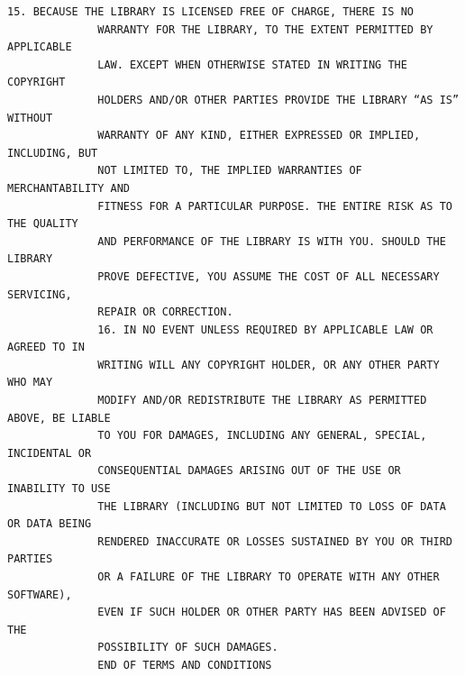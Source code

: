 \begin{lstlisting}[basicstyle=\ttfamily\scriptsize,breaklines=true]
              15. BECAUSE THE LIBRARY IS LICENSED FREE OF CHARGE, THERE IS NO
              WARRANTY FOR THE LIBRARY, TO THE EXTENT PERMITTED BY APPLICABLE
              LAW. EXCEPT WHEN OTHERWISE STATED IN WRITING THE COPYRIGHT
              HOLDERS AND/OR OTHER PARTIES PROVIDE THE LIBRARY “AS IS” WITHOUT
              WARRANTY OF ANY KIND, EITHER EXPRESSED OR IMPLIED, INCLUDING, BUT
              NOT LIMITED TO, THE IMPLIED WARRANTIES OF MERCHANTABILITY AND
              FITNESS FOR A PARTICULAR PURPOSE. THE ENTIRE RISK AS TO THE QUALITY
              AND PERFORMANCE OF THE LIBRARY IS WITH YOU. SHOULD THE LIBRARY
              PROVE DEFECTIVE, YOU ASSUME THE COST OF ALL NECESSARY SERVICING,
              REPAIR OR CORRECTION.
              16. IN NO EVENT UNLESS REQUIRED BY APPLICABLE LAW OR AGREED TO IN
              WRITING WILL ANY COPYRIGHT HOLDER, OR ANY OTHER PARTY WHO MAY
              MODIFY AND/OR REDISTRIBUTE THE LIBRARY AS PERMITTED ABOVE, BE LIABLE
              TO YOU FOR DAMAGES, INCLUDING ANY GENERAL, SPECIAL, INCIDENTAL OR
              CONSEQUENTIAL DAMAGES ARISING OUT OF THE USE OR INABILITY TO USE
              THE LIBRARY (INCLUDING BUT NOT LIMITED TO LOSS OF DATA OR DATA BEING
              RENDERED INACCURATE OR LOSSES SUSTAINED BY YOU OR THIRD PARTIES
              OR A FAILURE OF THE LIBRARY TO OPERATE WITH ANY OTHER SOFTWARE),
              EVEN IF SUCH HOLDER OR OTHER PARTY HAS BEEN ADVISED OF THE
              POSSIBILITY OF SUCH DAMAGES.
              END OF TERMS AND CONDITIONS
\end{lstlisting}
